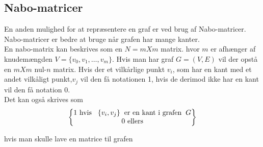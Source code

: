 \subsection{Nabo-matricer}
En anden mulighed for at repræsentere en graf er ved brug af Nabo-matricer. Nabo-matricer er bedre at bruge når grafen har mange kanter.\\
En nabo-matrix kan beskrives som en $N=m X m$ matrix. hvor $m$ er afhænger af knudemængden $V=\{v_0, v_1, \ldots, v_m\}$. Hvis man har graf $G=(V,E)$ vil der opstå en $m X m$ nul-$n$ matrix. Hvis der et vilkårlige punkt $v_i$, som har en kant med et andet vilkåligt punkt,$v_j$ vil den få notationen 1, hvis de derimod ikke har en kant vil den få notation 0. \\

Det kan også skrives som \\

\begin{equation}
\begin{Bmatrix} 
	 \textrm{1 hvis} \hspace{0.3cm}\{v_i,v_j\} \hspace{0.2cm} \textrm{er en kant i grafen} \hspace{0.2cm} G \\
	 \textrm{0 ellers} \\
	\end{Bmatrix}
\end{equation}

hvis man skulle lave en matrice til grafen  

	

